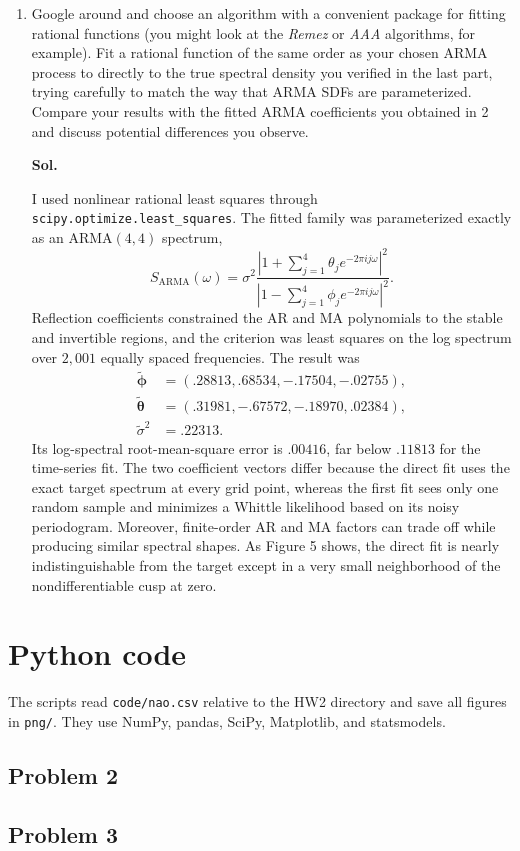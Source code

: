 \documentclass[lang=en,11pt,a4paper,citestyle =authoryear]{elegantpaper}
\begin{document}
\begin{enumerate}[label=\arabic*.,leftmargin=*]
\item[$4^*$.] Google around and choose an algorithm with a convenient package for fitting rational functions (you might look at the \textit{Remez} or \textit{AAA} algorithms, for example). Fit a rational function of the same order as your chosen ARMA process to directly to the true spectral density you verified in the last part, trying carefully to match the way that ARMA SDFs are parameterized. Compare your results with the fitted ARMA coefficients you obtained in 2 and discuss potential differences you observe.
\par\vspace{0.5em}\textbf{Sol.}\par
I used nonlinear rational least squares through
\texttt{scipy.optimize.least\_squares}. The fitted family was parameterized
exactly as an ARMA$(4,4)$ spectrum,
\[
S_{\mathrm{ARMA}}(\omega)
=\sigma^2\frac{|1+\sum_{j=1}^4\theta_je^{-2\pi ij\omega}|^2}
{|1-\sum_{j=1}^4\phi_je^{-2\pi ij\omega}|^2}.
\]
Reflection coefficients constrained the AR and MA polynomials to the stable
and invertible regions, and the criterion was least squares on the log
spectrum over $2{,}001$ equally spaced frequencies. The result was
\begin{align*}
\widetilde{\boldsymbol\phi}
&=(.28813,.68534,-.17504,-.02755),\\
\widetilde{\boldsymbol\theta}
&=(.31981,-.67572,-.18970,.02384),\\
\widetilde\sigma^2&=.22313.
\end{align*}
Its log-spectral root-mean-square error is $.00416$, far below $.11813$ for
the time-series fit. The two coefficient vectors differ because the direct fit
uses the exact target spectrum at every grid point, whereas the first fit sees
only one random sample and minimizes a Whittle likelihood based on its noisy
periodogram. Moreover, finite-order AR and MA factors can trade off while
producing similar spectral shapes. As Figure 5 shows, the direct fit is nearly
indistinguishable from the target except in a very small neighborhood of the
nondifferentiable cusp at zero.
\end{enumerate}

\clearpage
\appendix
\section{Python code}
The scripts read \texttt{code/nao.csv} relative to the HW2 directory and save
all figures in \texttt{png/}. They use NumPy, pandas, SciPy, Matplotlib, and
statsmodels.

\subsection{Problem 2}


\clearpage
\subsection{Problem 3}

\end{document}
